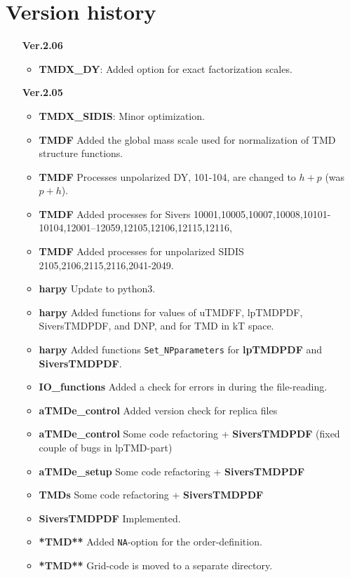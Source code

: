 \documentclass[prd,nofootinbib,eqsecnum,final]{revtex4}
\renewcommand{\(}{\left(}
\renewcommand{\)}{\right)}
\renewcommand{\[}{\left[}
\renewcommand{\]}{\right]}
\begin{document}
\section{Version history}
\begin{itemize}
\item[\textbf{Ver.2.06}]
\begin{itemize}
	\item \textbf{TMDX\_DY}: Added option for exact factorization scales.
\end{itemize}

\item[\textbf{Ver.2.05}]
\begin{itemize}
	\item \textbf{TMDX\_SIDIS}: Minor optimization.
	\item \textbf{TMDF} Added the global mass scale used for normalization of TMD structure functions.
	\item \textbf{TMDF} Processes unpolarized DY, 101-104, are changed to $h+p$ (was $p+h$).
	\item \textbf{TMDF} Added processes for Sivers 10001,10005,10007,10008,10101-10104,12001--12059,12105,12106,12115,12116,
	\item \textbf{TMDF} Added processes for unpolarized SIDIS 2105,2106,2115,2116,2041-2049.
	\item \textbf{harpy} Update to python3.
	\item \textbf{harpy} Added functions for values of uTMDFF, lpTMDPDF, SiversTMDPDF, and DNP, and for TMD in kT space.
	\item \textbf{harpy} Added functions \texttt{Set\_NPparameters} for \textbf{lpTMDPDF} and \textbf{SiversTMDPDF}.
	\item \textbf{IO\_functions} Added a check for errors in during the file-reading.
	\item \textbf{aTMDe\_control} Added version check for replica files
	\item \textbf{aTMDe\_control} Some code refactoring + \textbf{SiversTMDPDF} (fixed couple of bugs in lpTMD-part)
	\item \textbf{aTMDe\_setup} Some code refactoring + \textbf{SiversTMDPDF}
	\item \textbf{TMDs} Some code refactoring + \textbf{SiversTMDPDF}
	\item \textbf{SiversTMDPDF} Implemented.
	\item \textbf{*TMD**} Added \texttt{NA}-option for the order-definition.
	\item \textbf{*TMD**} Grid-code is moved to a separate directory.
\end{itemize}


\end{itemize}
\end{document}
